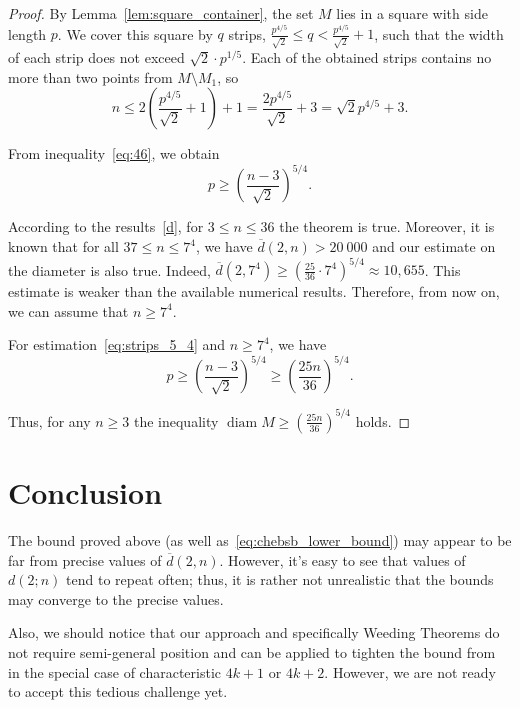 \documentclass[a4paper,14pt]{article} %
\theoremstyle{plain}
\theoremstyle{definition}
\begin{document}
\begin{proof}
	By Lemma~\ref{lem:square_container}, the set $M$ lies in a square with side length $p$. We cover this square by $q$ strips, $\frac{p^{4/5}}{\sqrt{2}} \leq q < \frac{p^{4/5}}{\sqrt{2}} + 1$, such that the width of each strip does not exceed $\sqrt{2} \cdot p^{1/5}$.
	Each of the obtained strips contains no more than two points from $M \setminus {M_1}$, so
	\begin{equation}
		\label{eq:46}
		n \leq 2 \left( \frac{p^{4/5}}{\sqrt{2}} + 1\right) + 1=\frac{2p^{4/5}}{\sqrt{2}} +3 = \sqrt{2}p^{4/5}+3
		.
	\end{equation}

	From inequality~\eqref{eq:46}, we obtain
	\begin{equation}
		\label{eq:strips_5_4}
		p \geq \left( \frac{n -3}{\sqrt{2}} \right)^{5/4}
		.
	\end{equation}

	According to the results~\eqref{d}, for $3 \leq n \leq 36$ the theorem is true.
	Moreover, it is known that for all $37 \leq n \leq 7^4$, we have $\overline{d}(2, n) > 20\ 000$  and our estimate on the diameter is also true.
	Indeed, $\overline{d}(2, 7^4) \geq \left(\frac{25}{36}\cdot 7^4\right)^{5/4} \approx 10,655$.
	This estimate is weaker than the available numerical results. Therefore, from now on, we can assume that $n \geq 7^4$.

	For estimation~\eqref{eq:strips_5_4} and $n \geq 7^4$, we have
	\begin{equation}
		\label{eq:strips_5_4_7}
		p \geq \left( \frac{n -3}{\sqrt{2}} \right)^{5/4}  \geq \left( \frac{25n}{36} \right)^{5/4}
		.
	\end{equation}

	Thus, for any $n \geq 3$ the inequality $
		\operatorname{diam} M \geq \left( \frac{25n}{36} \right)^{5/4}
	$ holds.
\end{proof}



\section{Conclusion}
	The bound proved above (as well as~\eqref{eq:chebsb_lower_bound}) may appear to be far from precise values of $\overline{d}(2,n)$.
	However, it's easy to see that values of $d(2;n)$ tend to repeat often;
	thus, it is rather not unrealistic that the bounds may converge to the precise values.

	Also, we should notice that our approach and  specifically Weeding Theorems do not require semi-general position and can be applied to tighten the bound from~\cite{my-pps-linear-bound-2019}
	in the special case of characteristic $4k+1$ or $4k+2$.
	However, we are not ready to accept this tedious challenge yet.
\end{document}

